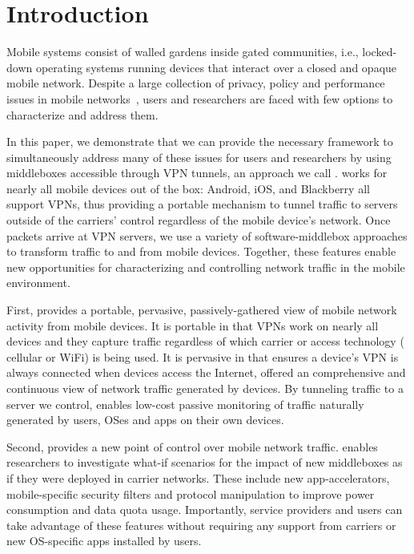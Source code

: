 \section{Introduction}
\label{sec:introduction}

Mobile systems consist of walled gardens inside gated 
communities, i.e., locked-down operating systems running 
devices that interact over a closed and opaque mobile network. 
Despite a large collection of privacy, policy and performance issues
in mobile networks~\cite{enck:taintdroid,hornyack:appfence,speedtest,eprof},
users and researchers are faced with few options to  
characterize and address them.

In this paper, we demonstrate that we can provide the necessary framework to
simultaneously address many of these issues for users and researchers by using
middleboxes accessible through VPN tunnels, an approach we call
\meddle.  \meddle works for nearly all mobile devices out of the box:
Android, iOS, and Blackberry all support VPNs, thus providing a
portable mechanism to tunnel traffic to servers outside of the
carriers' control regardless of the mobile device's network.  Once
packets arrive at VPN servers, we use a variety of software-middlebox
approaches to transform traffic to and from mobile devices. Together, 
these features enable new opportunities for characterizing and 
controlling network traffic in the mobile environment.

First, \meddle provides a portable, pervasive, passively-gathered view of mobile network activity 
from mobile devices. It is portable in that VPNs work on nearly all 
devices and they capture traffic regardless of which carrier or access technology (\eg 
cellular or WiFi) is being used. It is pervasive in that \meddle ensures a 
device's VPN is always connected when devices access the Internet, offered 
an comprehensive and continuous view of network traffic generated by devices. By tunneling traffic to a server we control, \meddle enables low-cost passive monitoring 
of traffic naturally generated by users, OSes and apps on their own devices.

Second, \meddle provides a new point of control over mobile 
network traffic. \meddle 
enables researchers to investigate what-if scenarios for the 
impact of new middleboxes as if they were deployed in carrier 
networks. These include new app-accelerators, 
mobile-specific security filters and protocol manipulation 
to improve power consumption and data quota usage. Importantly, 
service providers and users can take advantage of these features 
without requiring any support from carriers or new OS-specific 
apps installed by users.

